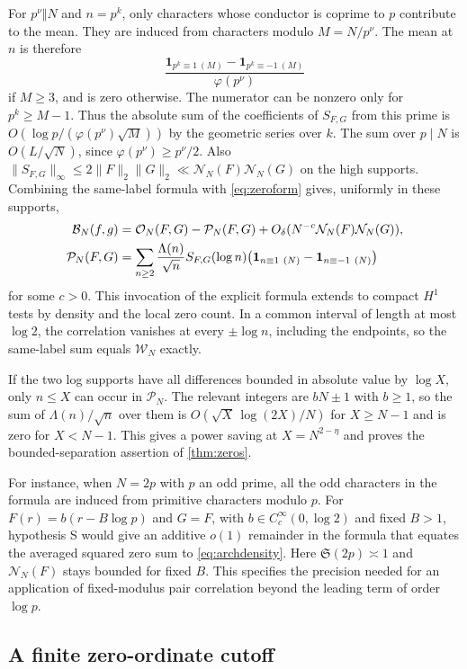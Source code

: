 \documentclass[11pt,a4paper]{article}
\numberwithin{equation}{section}
\newcommand{\SSS}{\mathfrak S}
\newcommand{\B}{\mathcal B_N}
\newcommand{\NN}{\mathcal N_N}
\begin{document}
For $p^\nu\Vert N$ and $n=p^k$, only characters whose conductor
is coprime to $p$ contribute to the mean. They are induced from
characters modulo $M=N/p^\nu$. The mean at $n$ is therefore
\[
 \frac{\mathbf1_{p^k\equiv1\ (M)}-\mathbf1_{p^k\equiv-1\ (M)}}
           {\varphi(p^\nu)}
\]
if $M\ge3$, and is zero otherwise. The numerator can be
nonzero only for $p^k\ge M-1$. Thus the absolute sum of the
coefficients of $S_{F,G}$ from this prime is
$O(\log p/(\varphi(p^\nu)\sqrt M))$ by the geometric series
over $k$. The sum over $p\mid N$ is $O(L/\sqrt N)$, since
$\varphi(p^\nu)\ge p^\nu/2$. Also
$\|S_{F,G}\|_\infty\le2\|F\|_2\|G\|_2\ll\NN(F)\NN(G)$
on the high supports. Combining the same-label formula
with \cref{eq:zeroform} gives, uniformly in these supports,
\begin{align}
 \B(f,g)
  &=\mathcal O_N(F,G)-\mathcal P_N(F,G)
       +O_\delta(N^{-c}\NN(F)\NN(G)), \notag\\
 \mathcal P_N(F,G)
  &=\sum_{n\ge2}\frac{\Lambda(n)}{\sqrt n}S_{F,G}(\log n)
       \bigl(\mathbf1_{n\equiv1\ (N)}-\mathbf1_{n\equiv-1\ (N)}\bigr)
       \label{eq:samelabelcorrection}
\end{align}
for some $c>0$. This invocation of the explicit formula
extends to compact $H^1$ tests by density and the local zero
count. In a common interval of length at most $\log 2$,
the correlation vanishes at every $\pm\log n$, including
the endpoints, so the same-label sum equals $\mathcal W_N$
exactly.

If the two log supports have all differences bounded in
absolute value by $\log X$, only $n\le X$ can occur in
$\mathcal P_N$. The relevant integers are $bN\pm1$ with
$b\ge1$, so the sum of $\Lambda(n)/\sqrt n$ over them
is $O(\sqrt X\,\log(2X)/N)$ for $X\ge N-1$ and is zero for
$X<N-1$. This gives a power saving at $X=N^{2-\eta}$ and
proves the bounded-separation assertion of \cref{thm:zeros}.

For instance, when $N=2p$ with $p$ an odd prime, all the odd
characters in the formula are induced from primitive characters
modulo $p$. For $F(r)=b(r-B\log p)$ and $G=F$, with
$b\in C_c^\infty(0,\log 2)$ and fixed $B>1$, hypothesis S would
give an additive $o(1)$ remainder in the formula that equates
the averaged squared zero sum to \cref{eq:archdensity}.
Here $\SSS(2p)\asymp1$ and $\NN(F)$ stays bounded for fixed $B$.
This specifies the precision needed for an application of
fixed-modulus pair correlation beyond the leading term of
order $\log p$.

\subsection{A finite zero-ordinate cutoff}
\end{document}
